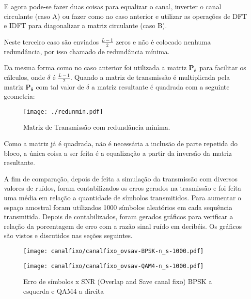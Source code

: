 \documentclass[a4paper,twoside]{articlewithlogo}
\begin{document}
E agora pode-se fazer duas coisas para equalizar o canal, inverter o canal circulante (caso A) ou fazer como no caso anterior e utilizar as operações de DFT e IDFT para diagonalizar a matriz circulante (caso B).

Neste terceiro caso são enviados $\frac{L-1}{2}$ zeros e não é colocado nenhuma redundância, por isso chamado de redundância mínima.

Da mesma forma como no caso anterior foi utilizada a matriz $\mathbf{P_\delta}$ para facilitar os cálculos, onde $\delta$ é $\frac{L-1}{2}$. Quando a matriz de transmissão é multiplicada pela matriz $\mathbf{P_\delta}$ com tal valor de $\delta$ a matriz resultante é quadrada com a seguinte geometria:

\begin{figure}[H]
	\begin{center}	
		\texttt{[image: ./redunmin.pdf]}
		\caption{Matriz de Transmissão com redundância mínima.}
		\label{fig:Ovadd_circ}
	\end{center}
\end{figure}

Como a matriz já é quadrada, não é necessária a inclusão de parte repetida do bloco, a única coisa a ser feita é a equalização a partir da inversão da matriz resultante.

A fim de comparação, depois de feita a simulação da transmissão com diversos valores de ruídos, foram contabilizados os erros gerados na trasmissão e foi feita uma média em relação a quantidade de símbolos transmitidos. Para aumentar o espaço amostral foram utilizados 1000 símbolos aleatórios em cada sequência transmitida. Depois de contabilizados, foram gerados gráficos para verificar a relação da porcentagem de erro com a razão sinal ruído em decibéis.
Os gráficos são vistos e discutidos nas seções seguintes.


\begin{figure}[H]
    \centering
    \begin{minipage}{.5\textwidth}
        \centering
        \texttt{[image: canalfixo/canalfixo\_ovsav-BPSK-n\_s-1000.pdf]}
    \end{minipage}%
    \begin{minipage}{0.5\textwidth}
        \centering
        \texttt{[image: canalfixo/canalfixo\_ovsav-QAM4-n\_s-1000.pdf]}
    \end{minipage}
    \caption{Erro de símbolos x SNR (Overlap and Save canal fixo) BPSK a esquerda e QAM4 a direita}
    \label{fig:canalfixo_ovsav}
\end{figure}
\end{document}

